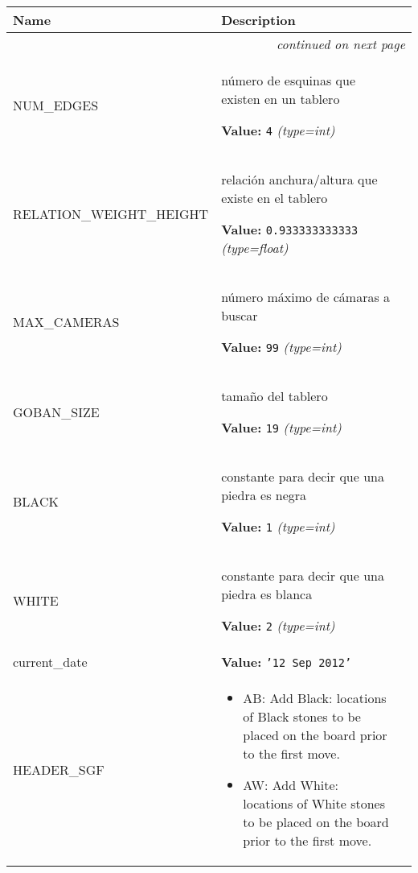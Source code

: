     \vspace{-1cm}
\hspace{\varindent}\begin{longtable}{|p{\varnamewidth}|p{\vardescrwidth}|l}
\cline{1-2}
\cline{1-2} \centering \textbf{Name} & \centering \textbf{Description}& \\
\cline{1-2}
\endhead\cline{1-2}\multicolumn{3}{r}{\small\textit{continued on next page}}\\\endfoot\cline{1-2}
\endlastfoot\raggedright N\-U\-M\-\_\-E\-D\-G\-E\-S\- & \raggedright número de esquinas que existen en un tablero

\textbf{Value:} 
{\tt 4}            {\it (type=int)}&\\
\cline{1-2}
\raggedright R\-E\-L\-A\-T\-I\-O\-N\-\_\-W\-E\-I\-G\-H\-T\-\_\-H\-E\-I\-G\-H\-T\- & \raggedright relación anchura/altura que existe en el tablero

\textbf{Value:} 
{\tt 0.933333333333}            {\it (type=float)}&\\
\cline{1-2}
\raggedright M\-A\-X\-\_\-C\-A\-M\-E\-R\-A\-S\- & \raggedright número máximo de cámaras a buscar

\textbf{Value:} 
{\tt 99}            {\it (type=int)}&\\
\cline{1-2}
\raggedright G\-O\-B\-A\-N\-\_\-S\-I\-Z\-E\- & \raggedright tamaño del tablero

\textbf{Value:} 
{\tt 19}            {\it (type=int)}&\\
\cline{1-2}
\raggedright B\-L\-A\-C\-K\- & \raggedright constante para decir que una piedra es negra

\textbf{Value:} 
{\tt 1}            {\it (type=int)}&\\
\cline{1-2}
\raggedright W\-H\-I\-T\-E\- & \raggedright constante para decir que una piedra es blanca

\textbf{Value:} 
{\tt 2}            {\it (type=int)}&\\
\cline{1-2}
\raggedright c\-u\-r\-r\-e\-n\-t\-\_\-d\-a\-t\-e\- & \raggedright \textbf{Value:} 
{\tt \texttt{'}\texttt{12 Sep 2012}\texttt{'}}&\\
\cline{1-2}
\raggedright H\-E\-A\-D\-E\-R\-\_\-S\-G\-F\- & \raggedright %
\begin{itemize}

\item AB: Add Black: locations of Black stones to be placed on the board prior to the first move.

\item AW: Add White: locations of White stones to be placed on the board prior to the first move.


\end{itemize}
\end{longtable}

